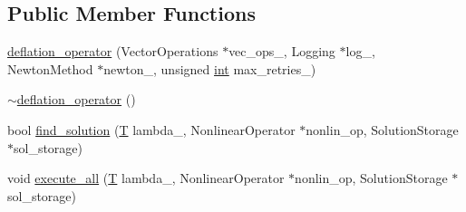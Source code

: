 \subsection*{Public Member Functions}
\begin{DoxyCompactItemize}
\item 
\hyperlink{classdeflation_1_1deflation__operator_a5b2e753f49c15be40463b2e4d6e517cb}{deflation\-\_\-operator} (Vector\-Operations $\ast$vec\-\_\-ops\-\_\-, Logging $\ast$log\-\_\-, Newton\-Method $\ast$newton\-\_\-, unsigned \hyperlink{classint}{int} max\-\_\-retries\-\_\-)
\item 
\hyperlink{classdeflation_1_1deflation__operator_af5d9863c70c4b5fdef6076055ffa8693}{$\sim$deflation\-\_\-operator} ()
\item 
bool \hyperlink{classdeflation_1_1deflation__operator_abd4952c8eea335ff08790245e7bbde9d}{find\-\_\-solution} (\hyperlink{classdeflation_1_1deflation__operator_a16b4c1329afeb50d9477f1094df943b9}{T} lambda\-\_, Nonlinear\-Operator $\ast$nonlin\-\_\-op, Solution\-Storage $\ast$sol\-\_\-storage)
\item 
void \hyperlink{classdeflation_1_1deflation__operator_a35208c148ef288abd8b2191ee5731581}{execute\-\_\-all} (\hyperlink{classdeflation_1_1deflation__operator_a16b4c1329afeb50d9477f1094df943b9}{T} lambda\-\_, Nonlinear\-Operator $\ast$nonlin\-\_\-op, Solution\-Storage $\ast$sol\-\_\-storage)
\end{DoxyCompactItemize}


